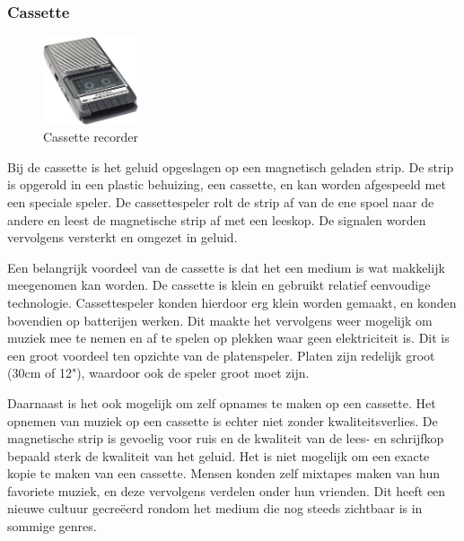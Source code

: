 \subsubsection*{Cassette}
\begin{figure}
    \centering
    \includegraphics[width=0.25\textwidth]{assets/critical-review/Tape.jpg}
    \caption{Cassette recorder}
    \label{fig:critical-review:tape}
\end{figure}
Bij de cassette is het geluid opgeslagen op een magnetisch geladen strip. De strip is opgerold in een plastic behuizing, een cassette, en kan worden afgespeeld met een speciale speler. De cassettespeler rolt de strip af van de ene spoel naar de andere en leest de magnetische strip af met een leeskop. De signalen worden vervolgens versterkt en omgezet in geluid.

Een belangrijk voordeel van de cassette is dat het een medium is wat makkelijk meegenomen kan worden. De cassette is klein en gebruikt relatief eenvoudige technologie. Cassettespeler konden hierdoor erg klein worden gemaakt, en konden bovendien op batterijen werken. Dit maakte het vervolgens weer mogelijk om muziek mee te nemen en af te spelen op plekken waar geen elektriciteit is. Dit is een groot voordeel ten opzichte van de platenspeler. Platen zijn redelijk groot (30cm of 12"), waardoor ook de speler groot moet zijn.

Daarnaast is het ook mogelijk om zelf opnames te maken op een cassette. Het opnemen van muziek op een cassette is echter niet zonder kwaliteitsverlies. De magnetische strip is gevoelig voor ruis en de kwaliteit van de lees- en schrijfkop bepaald sterk de kwaliteit van het geluid. Het is niet mogelijk om een exacte kopie te maken van een cassette. Mensen konden zelf mixtapes maken van hun favoriete muziek, en deze vervolgens verdelen onder hun vrienden. Dit heeft een nieuwe cultuur gecreëerd rondom het medium die nog steeds zichtbaar is in sommige genres.

